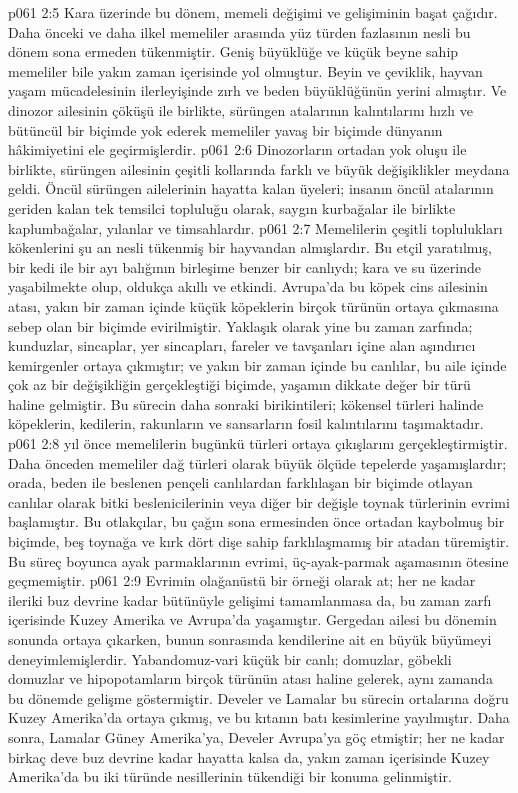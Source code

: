\vs p061 2:5 Kara üzerinde bu dönem, memeli değişimi ve gelişiminin başat çağıdır. Daha önceki ve daha ilkel memeliler arasında yüz türden fazlasının nesli bu dönem sona ermeden tükenmiştir. Geniş büyüklüğe ve küçük beyne sahip memeliler bile yakın zaman içerisinde yol olmuştur. Beyin ve çeviklik, hayvan yaşam mücadelesinin ilerleyişinde zırh ve beden büyüklüğünün yerini almıştır. Ve dinozor ailesinin çöküşü ile birlikte, sürüngen atalarının kalıntılarını hızlı ve bütüncül bir biçimde yok ederek memeliler yavaş bir biçimde dünyanın hâkimiyetini ele geçirmişlerdir.
\vs p061 2:6 Dinozorların ortadan yok oluşu ile birlikte, sürüngen ailesinin çeşitli kollarında farklı ve büyük değişiklikler meydana geldi. Öncül sürüngen ailelerinin hayatta kalan üyeleri; insanın öncül atalarının geriden kalan tek temsilci topluluğu olarak, saygın kurbağalar ile birlikte kaplumbağalar, yılanlar ve timsahlardır.
\vs p061 2:7 Memelilerin çeşitli toplulukları kökenlerini şu an nesli tükenmiş bir hayvandan almışlardır. Bu etçil yaratılmış, bir kedi ile bir ayı balığının birleşime benzer bir canlıydı; kara ve su üzerinde yaşabilmekte olup, oldukça akıllı ve etkindi. Avrupa’da bu köpek cins ailesinin atası, yakın bir zaman içinde küçük köpeklerin birçok türünün ortaya çıkmasına sebep olan bir biçimde evirilmiştir. Yaklaşık olarak yine bu zaman zarfında; kunduzlar, sincaplar, yer sincapları, fareler ve tavşanları içine alan aşındırıcı kemirgenler ortaya çıkmıştır; ve yakın bir zaman içinde bu canlılar, bu aile içinde çok az bir değişikliğin gerçekleştiği biçimde, yaşamın dikkate değer bir türü haline gelmiştir. Bu sürecin daha sonraki birikintileri; kökensel türleri halinde köpeklerin, kedilerin, rakunların ve sansarların fosil kalıntılarını taşımaktadır.
\vs p061 2:8  yıl önce memelilerin bugünkü türleri ortaya çıkışlarını gerçekleştirmiştir. Daha önceden memeliler dağ türleri olarak büyük ölçüde tepelerde yaşamışlardır;  orada, beden ile beslenen pençeli canlılardan farklılaşan bir biçimde otlayan canlılar olarak bitki beslenicilerinin veya diğer bir değişle toynak türlerinin evrimi başlamıştır. Bu otlakçılar, bu çağın sona ermesinden önce ortadan kaybolmuş bir biçimde, beş toynağa ve kırk dört dişe sahip farklılaşmamış bir atadan türemiştir. Bu süreç boyunca ayak parmaklarının evrimi, üç\hyp{}ayak\hyp{}parmak aşamasının ötesine geçmemiştir.
\vs p061 2:9 Evrimin olağanüstü bir örneği olarak at; her ne kadar ileriki buz devrine kadar bütünüyle gelişimi tamamlanmasa da, bu zaman zarfı içerisinde Kuzey Amerika ve Avrupa’da yaşamıştır. Gergedan ailesi bu dönemin sonunda ortaya çıkarken, bunun sonrasında kendilerine ait en büyük büyümeyi deneyimlemişlerdir. Yabandomuz\hyp{}vari küçük bir canlı; domuzlar, göbekli domuzlar ve hipopotamların birçok türünün atası haline gelerek, aynı zamanda bu dönemde gelişme göstermiştir. Develer ve Lamalar bu sürecin ortalarına doğru Kuzey Amerika’da ortaya çıkmış, ve bu kıtanın batı kesimlerine yayılmıştır. Daha sonra, Lamalar Güney Amerika’ya, Develer Avrupa’ya göç etmiştir; her ne kadar birkaç deve buz devrine kadar hayatta kalsa da, yakın zaman içerisinde Kuzey Amerika’da bu iki türünde nesillerinin tükendiği bir konuma gelinmiştir.
